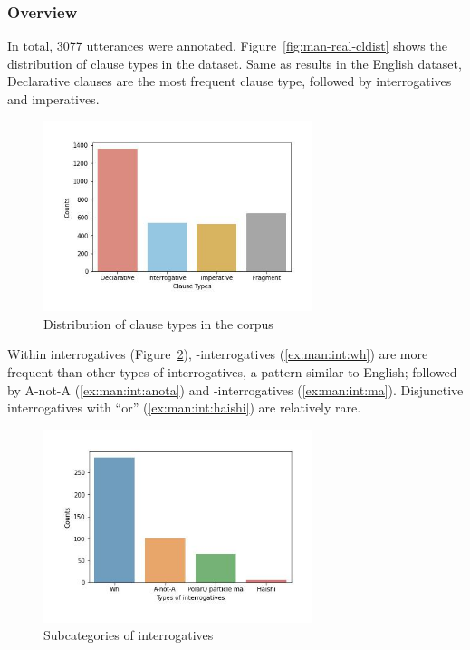 \subsubsection{Overview}
\label{sec:mancl:corpus:results:mapping}

In total, 3077 utterances were annotated. Figure~\ref{fig:man-real-cldist} shows the distribution of clause types in the dataset. Same as results in the English dataset, Declarative clauses are the most frequent clause type, followed by interrogatives and imperatives. 

\begin{figure}[H]
    \centering
    \includegraphics[width=0.7\textwidth]{figures/man-real-cldist.jpg}
    \caption{Distribution of clause types in the corpus}
    \label{fig:man:real-cldist}
\end{figure}

Within interrogatives (Figure~\ref{fig:man:real-subint}), \twh-interrogatives (\ref{ex:man:int:wh}) are more frequent than other types of interrogatives, a pattern similar to English; followed by A-not-A (\ref{ex:man:int:anota}) and -interrogatives (\ref{ex:man:int:ma}). Disjunctive interrogatives with  ``or'' (\ref{ex:man:int:haishi}) are relatively rare. 
\begin{figure}[H]
    \centering
    \includegraphics[width=0.7\textwidth]{figures/man-real-subint.jpg}
    \caption{Subcategories of interrogatives}
    \label{fig:man:real-subint}
\end{figure}

